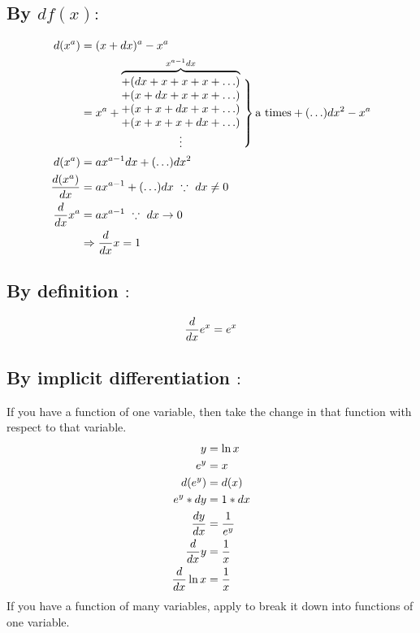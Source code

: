 \documentclass[a4paper,14pt,twoside]{book}
\begin{document}
{\subsection{By $df(x):$}
\begin{align*}
	d(x^a)        & = (x+dx)^a - x^a                            \\
	              & = x^a
	+ \overbrace{\begin{matrix}
			+ (dx + x + x + x + \ldots) \\
			+ (x + dx + x + x + \ldots) \\
			+ (x + x + dx + x + \ldots) \\
			+ (x + x + x + dx + \ldots) \\
			\vdots
		\end{matrix}}^{x^{a-1}dx}
	\left. \phantom{\begin{matrix} \\ \\ \\ \\ \\ \end{matrix}} \right\}
	\T{a times}
	+ (\ldots)dx^2
	- x^a                                                       \\
	d(x^a)        & = ax^{a-1}dx + (\ldots)dx^2                 \\
	\DD{(x^a)}{x} & = ax^{a-1} + (\ldots)dx\ \because\ dx \ne 0 \\
	\D x^a        & = ax^{a-1}\ \because\ dx \to 0              \\
	              & \Rightarrow \D x = 1
\end{align*}
\subsection{By definition $:$}
\begin{align*}
	\frac{d}{dx} e^x = e^x
\end{align*}
\subsection{By implicit differentiation $:$}
If you have a function of one variable, then take the change in that function with respect to that variable.
\begin{align*}
	y           & = \ln{x}     \\
	e^y         & = x          \\
	d(e^y)      & = d(x)       \\
	e^y * dy    & = 1*dx       \\
	\frac{dy}{dx}  & = \frac{1}{e^y} \\
	\frac{d}{dx} y & = \frac{1}{x}   \\
	\frac{d}{dx} \ln{x}   & = \frac{1}{x}
\end{align*}
If you have a function of many variables,
apply  to break it down into functions of one variable.
}
\end{document}
